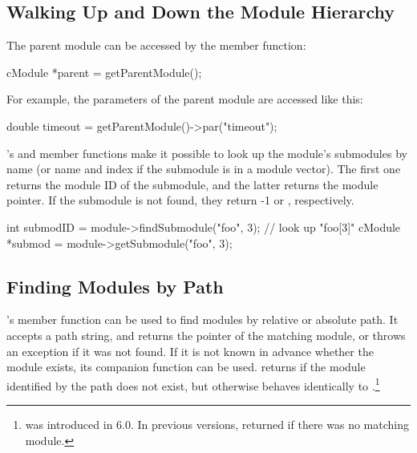 \subsection{Walking Up and Down the Module Hierarchy}
\label{sec:simple-modules:walking-up-and-down-module-hierarchy}

The parent module can be accessed by the 
member function:

\begin{cpp}
cModule *parent = getParentModule();
\end{cpp}

For example, the parameters of the parent module are accessed
like this:

\begin{cpp}
double timeout = getParentModule()->par("timeout");
\end{cpp}

's  and 
member functions make it possible to look up the module's submodules
by name (or name and index if the submodule
is in a module vector). The first one returns the module ID of
the submodule, and the latter returns the module pointer. If the
submodule is not found, they return -1 or , respectively.

\begin{cpp}
int submodID = module->findSubmodule("foo", 3); // look up "foo[3]"
cModule *submod = module->getSubmodule("foo", 3);
\end{cpp}


\subsection{Finding Modules by Path}
\label{sec:simple-modules:finding-modules-by-path}

's  member function can be used to
find modules by relative or absolute path. It accepts a path string, and
returns the pointer of the matching module, or throws an exception if it
was not found. If it is not known in advance whether the module exists,
its companion function  can be used.
 returns  if the module
identified by the path does not exist, but otherwise behaves identically
to .\footnote{ was
introduced in {\omnetpp} 6.0. In previous versions, 
returned  if there was no matching module.}

